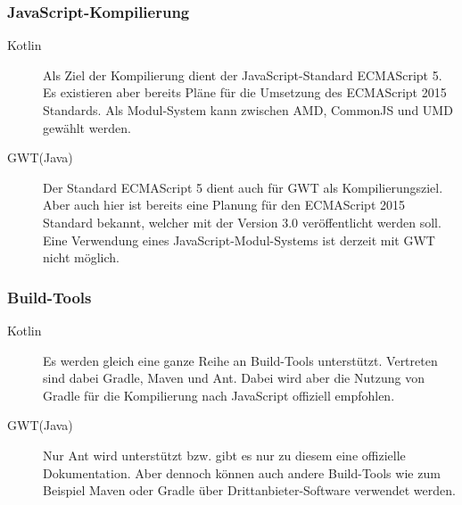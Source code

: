 \subsubsection{JavaScript-Kompilierung}
\begin{description}
	\item[Kotlin] Als Ziel der Kompilierung dient der JavaScript-Standard ECMAScript 5. Es existieren aber bereits Pläne für die Umsetzung des ECMAScript 2015 Standards. Als Modul-System kann zwischen \gls{AMD}, CommonJS und \gls{UMD} gewählt werden. \cite{kotlinJavaScript, kotlinJsModules} 
	\item[GWT(Java)] Der Standard ECMAScript 5 dient auch für \gls{GWT} als Kompilierungsziel. Aber auch hier ist bereits eine Planung für den ECMAScript 2015 Standard bekannt, welcher mit der Version 3.0 veröffentlicht werden soll. Eine Verwendung eines JavaScript-Modul-Systems ist derzeit mit \gls{GWT} nicht möglich. \cite{gwtRoadmap}
\end{description}

\subsubsection{Build-Tools}
\begin{description}
	\item[Kotlin] Es werden gleich eine ganze Reihe an Build-Tools unterstützt. Vertreten sind dabei Gradle, Maven und Ant. Dabei wird aber die Nutzung von Gradle für die Kompilierung nach JavaScript offiziell empfohlen. \cite{kotlinBuildTools, kotlinToJavaScript}
	\item[GWT(Java)] Nur Ant wird unterstützt bzw. gibt es nur zu diesem eine offizielle Dokumentation. Aber dennoch können auch andere Build-Tools wie zum Beispiel Maven oder Gradle über Drittanbieter-Software verwendet werden. \cite{gwtGettingStarted}
\end{description}

